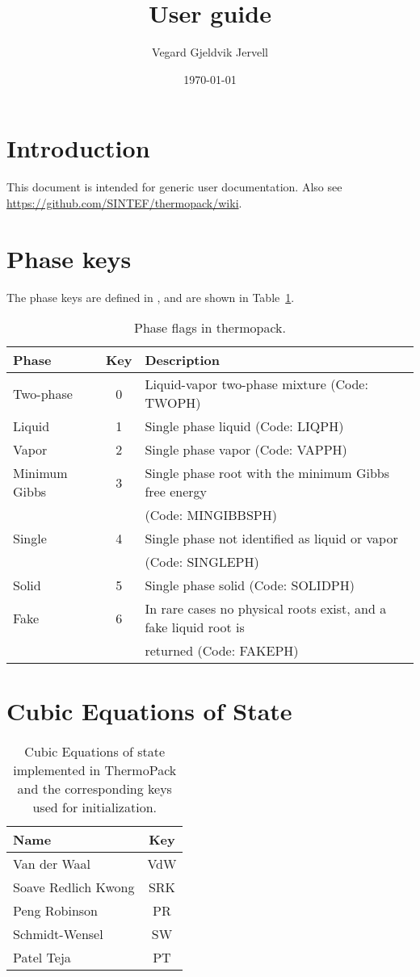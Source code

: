 \documentclass[english]{../thermomemo/thermomemo}
\title{User guide}
\author{Vegard Gjeldvik Jervell}
\date{\today}
\begin{document}
\frontmatter
\tableofcontents

\section{Introduction}
This document is intended for generic user documentation. Also see
\url{https://github.com/SINTEF/thermopack/wiki}.

\section{Phase keys}
The phase keys are defined in ,
and are shown in Table~\ref{tab:phase_flags_thermopack}.
\begin{table}[ht!]
  \centering
  \begin{tabular}{l c l}
    \toprule
    Phase & Key & Description\\
    \midrule
    Two-phase & 0 & Liquid-vapor two-phase mixture (Code: TWOPH)\\
    Liquid & 1 & Single phase liquid (Code: LIQPH) \\
    Vapor & 2 & Single phase vapor (Code: VAPPH) \\
    Minimum Gibbs & 3 & Single phase root with the minimum Gibbs free energy \\ & & (Code: MINGIBBSPH) \\
    Single & 4 & Single phase not identified as liquid or vapor \\ & & (Code: SINGLEPH) \\
    Solid & 5 & Single phase solid (Code: SOLIDPH) \\
    Fake & 6 & In rare cases no physical roots exist, and a fake liquid root is \\ & & returned (Code: FAKEPH) \\
    \bottomrule
  \end{tabular}
  \caption{Phase flags in thermopack.}
  \label{tab:phase_flags_thermopack}
\end{table}

\section{Cubic Equations of State}

\begin{table}[ht!]
  \centering
  \begin{tabular}{l c }
    \toprule
    Name & Key \\
    \midrule
    Van der Waal & VdW\\
    Soave Redlich Kwong & SRK\\
    Peng Robinson & PR\\
    Schmidt-Wensel & SW\\
    Patel Teja & PT\\
    \bottomrule
  \end{tabular}
  \caption{Cubic Equations of state implemented in ThermoPack and the corresponding keys used for initialization.}
  \label{tab:EoS_thermopack}
\end{table}
\end{document}
